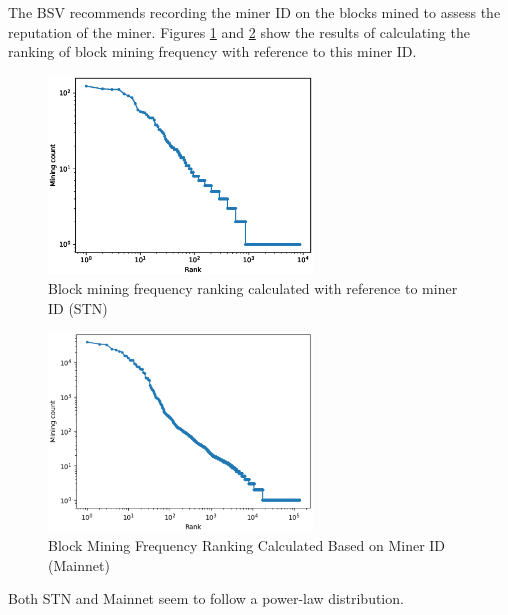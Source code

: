 \documentclass[graybox]{svmult}
\begin{document}
The BSV recommends recording the miner ID on the blocks mined to assess the reputation of the miner.
Figures \ref{fig:minerrank_stn} and \ref{fig:minerrank_mainnet} show the results of calculating the ranking of block mining frequency with reference to this miner ID.
%
\begin{figure}[t]
  \vspace{-35mm}
  \begin{center}
    \includegraphics[width=70mm]{bsv_stn-block_miners-ranking-loglog.eps}
  \end{center}
  \vspace{35mm}
  \caption{Block mining frequency ranking calculated with reference to miner ID (STN)}
  \label{fig:minerrank_stn}
\end{figure}
%
%
\begin{figure}[t]
  \begin{center}
    \includegraphics[width=70mm]{bsv_mainnet-block_miners-ranking-loglog.eps}
  \end{center}
  \caption{Block Mining Frequency Ranking Calculated Based on Miner ID (Mainnet)}
  \label{fig:minerrank_mainnet}
\end{figure}
%
Both STN and Mainnet seem to follow a power-law distribution.
\end{document}

